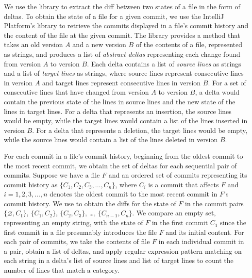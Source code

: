 We use the  \cite{java-diff-utils} library to extract the diff between two states of a file in the form of deltas. 
To obtain the state of a file for a given commit, we use the IntelliJ Platform's  library to retrieve the commits displayed in a file's commit history and the content of the file at the given commit.
The  library provides a method that takes an old version $A$ and a new version $B$ of the contents of a file, represented as strings, and produces a list of \emph{abstract deltas} representing each change found from version $A$ to version $B$. 
Each delta contains a list of \emph{source lines} as strings and a list of \emph{target lines} as strings, where source lines represent consecutive lines in version $A$ and target lines represent consecutive lines in version $B$. 
For a set of consecutive lines that have changed from version $A$ to version $B$, a delta would contain the previous state of the lines in source lines and the new state of the lines in target lines.
For a delta that represents an insertion, the source lines would be empty, while the target lines would contain a list of the lines inserted in version $B$.
For a delta that represents a deletion, the target lines would be empty, while the source lines would contain a list of the lines deleted in version $B$.

For each commit in a file's commit history, beginning from the oldest commit to the most recent commit, we obtain the set of deltas for each sequential pair of commits.
Suppose we have a file $F$ and an ordered set of commits representing its commit history as $\{C_{1}, C_{2}, C_{3}, \dots, C_{n}\}$, where $C_{i}$ is a commit that affects $F$ and $i = 1, 2, 3, \dots, n$ denotes the oldest commit to the most recent commit in $F$'s commit history.
We use  to obtain the diffs for the state of $F$ in the commit pairs $\{\varnothing, C_{1}\}$, $\{C_{1}, C_{2}\}$, $\{C_{2}, C_{3}\}$, \dots, $\{C_{n-1}, C_{n}\}$.
We compare an empty set, representing an empty string, with the state of $F$ in the first commit $C_{1}$ since the first commit in a file presumably introduces the file $F$ and its initial content.
For each pair of commits, we take the contents of file $F$ in each individual commit in a pair, obtain a list of deltas, and apply regular expression pattern matching on each string in a delta's list of source lines and list of target lines to count the number of lines that match a category.


